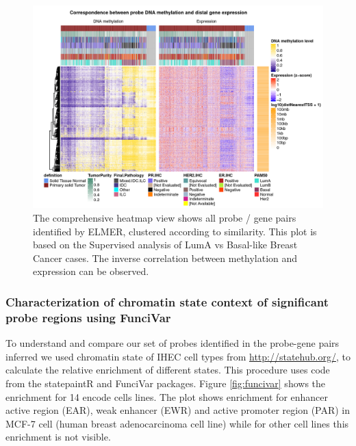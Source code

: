 \begin{figure}
\centering
\includegraphics[width=1.0\textwidth]{images/heatmap.jpg}
\caption{\label{fig:heatmap} The comprehensive heatmap view shows all probe / gene pairs identified by ELMER, clustered according to similarity. This plot is based on the Supervised analysis of LumA vs Basal-like Breast Cancer cases. The inverse correlation between methylation and expression can be observed.}
\end{figure}

\clearpage


\clearpage

\subsubsection*{Characterization of chromatin state context of significant probe regions using FunciVar}

To understand and compare our set of probes identified in the probe-gene pairs inferred
we used chromatin state of IHEC cell types
from \url{http://statehub.org/}, to calculate the relative enrichment of
different states.
This procedure uses code from the statepaintR \cite{statepaintr} and FunciVar \cite{funcivar} packages.
Figure \ref{fig:funcivar} shows the enrichment for 14 encode cells lines.
The plot shows enrichment for enhancer active region (EAR), weak enhancer (EWR)
and active promoter region (PAR) in MCF-7 cell (human breast adenocarcinoma cell line)
while for other cell lines this enrichment is not visible.

